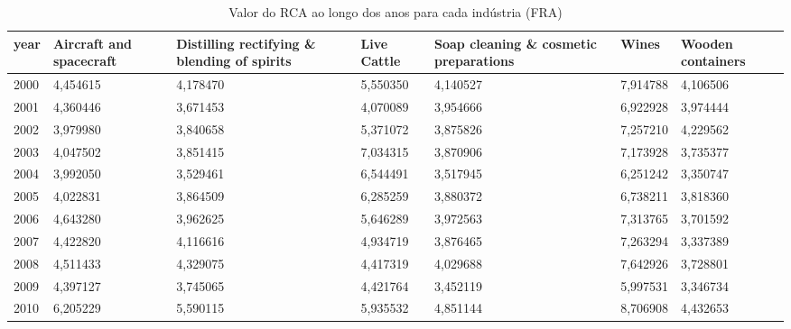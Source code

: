\begin{table}
\centering
\caption{Valor do RCA ao longo dos anos para cada indústria (FRA)}
\begin{tabular}{p{1cm}p{2cm}p{2cm}p{2cm}p{2cm}p{2cm}p{2cm}}
\toprule
 year &  Aircraft and spacecraft &  Distilling rectifying \& blending of spirits &  Live Cattle &  Soap cleaning \& cosmetic preparations &    Wines &  Wooden containers \\
\midrule
 2000 &                 4,454615 &                                     4,178470 &     5,550350 &                               4,140527 & 7,914788 &           4,106506 \\
 2001 &                 4,360446 &                                     3,671453 &     4,070089 &                               3,954666 & 6,922928 &           3,974444 \\
 2002 &                 3,979980 &                                     3,840658 &     5,371072 &                               3,875826 & 7,257210 &           4,229562 \\
 2003 &                 4,047502 &                                     3,851415 &     7,034315 &                               3,870906 & 7,173928 &           3,735377 \\
 2004 &                 3,992050 &                                     3,529461 &     6,544491 &                               3,517945 & 6,251242 &           3,350747 \\
 2005 &                 4,022831 &                                     3,864509 &     6,285259 &                               3,880372 & 6,738211 &           3,818360 \\
 2006 &                 4,643280 &                                     3,962625 &     5,646289 &                               3,972563 & 7,313765 &           3,701592 \\
 2007 &                 4,422820 &                                     4,116616 &     4,934719 &                               3,876465 & 7,263294 &           3,337389 \\
 2008 &                 4,511433 &                                     4,329075 &     4,417319 &                               4,029688 & 7,642926 &           3,728801 \\
 2009 &                 4,397127 &                                     3,745065 &     4,421764 &                               3,452119 & 5,997531 &           3,346734 \\
 2010 &                 6,205229 &                                     5,590115 &     5,935532 &                               4,851144 & 8,706908 &           4,432653 \\

\end{tabular}
\end{table}
